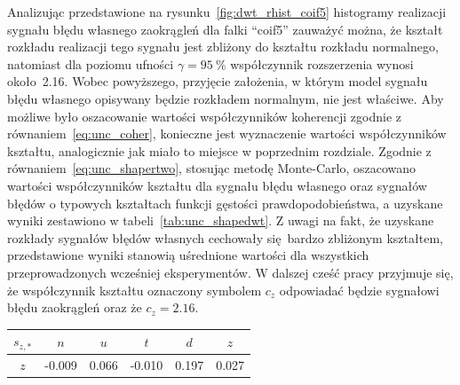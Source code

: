 Analizując przedstawione na rysunku~\ref{fig:dwt_rhist_coif5} histogramy realizacji sygnału błędu własnego zaokrągleń dla falki \enquote{coif5} zauważyć można, że kształt rozkładu realizacji tego sygnału jest zbliżony do kształtu rozkładu normalnego, natomiast dla poziomu ufności $\gamma = \qty{95}{\percent}$ współczynnik rozszerzenia wynosi około~\num{2.16}. Wobec powyższego, przyjęcie założenia, w którym model sygnału błędu własnego opisywany będzie rozkładem normalnym, nie jest właściwe. Aby możliwe było oszacowanie wartości współczynników koherencji zgodnie z równaniem~\eqref{eq:unc_coher}, konieczne jest wyznaczenie wartości współczynników kształtu, analogicznie jak miało to miejsce w poprzednim rozdziale. Zgodnie z równaniem~\eqref{eq:unc_shapertwo}, stosując metodę Monte-Carlo, oszacowano wartości współczynników kształtu dla sygnału błędu własnego oraz sygnałów błędów o typowych kształtach funkcji gęstości prawdopodobieństwa, a uzyskane wyniki zestawiono w tabeli~\ref{tab:unc_shapedwt}. Z uwagi na fakt, że uzyskane rozkłady sygnałów błędów własnych cechowały się bardzo zbliżonym kształtem, przedstawione wyniki stanowią uśrednione wartości dla wszystkich przeprowadzonych wcześniej eksperymentów. W dalszej cześć pracy przyjmuje się, że współczynnik kształtu oznaczony symbolem $c_{z}$ odpowiadać będzie sygnałowi błędu zaokrągleń oraz że $c_{z} = \num{2.16}$.

\begin{table}[htb!]
\begin{center}
\begin{tabular}[c]{| c *{5}{| S[table-format = +1.3] } |} \hline
$s_{z,*}$ & \textbf{$n$} & \textbf{$u$} & \textbf{$t$} & \textbf{$d$} & \textbf{$z$} \\ \hline
$z$       & -0.009       & 0.066        & -0.010       & 0.197        & 0.027        \\ \hline
\end{tabular}
\end{center}
\end{table}

